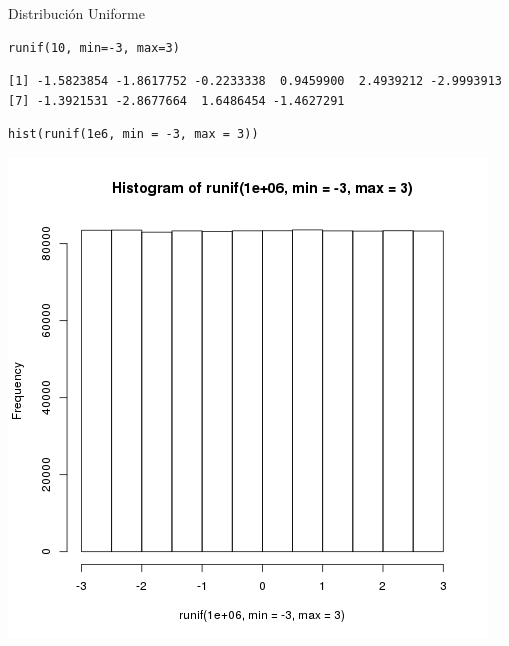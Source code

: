 \documentclass[xcolor={usenames,svgnames,dvipsnames}]{beamer}
\begin{document}
\begin{frame}[fragile,label=sec-3-5]{Distribución Uniforme}
 \lstset{language=R,label= ,caption= ,numbers=none}
\begin{lstlisting}
runif(10, min=-3, max=3)
\end{lstlisting}

\begin{verbatim}
[1] -1.5823854 -1.8617752 -0.2233338  0.9459900  2.4939212 -2.9993913
[7] -1.3921531 -2.8677664  1.6486454 -1.4627291
\end{verbatim}


\lstset{language=R,label= ,caption= ,numbers=none}
\begin{lstlisting}
hist(runif(1e6, min = -3, max = 3))
\end{lstlisting}

\includegraphics[height=0.6\textheight]{figs/runif.png}
\end{frame}
\end{document}
